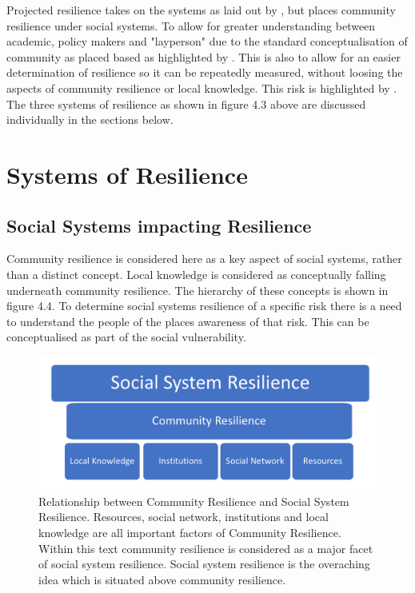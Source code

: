 Projected resilience takes on the systems as laid out by \cite{cutter_community_2020}, but places community resilience under social systems. To allow for greater understanding between academic, policy makers and "layperson" due to the standard conceptualisation of community as placed based as highlighted by \cite{rasanen_conceptualizing_2020}. This is also to allow for an easier determination of resilience so it can be repeatedly measured, without loosing the aspects of community resilience or local knowledge. This risk is highlighted by \cite{rasanen_conceptualizing_2020}. The three systems of resilience as shown in figure 4.3 above are discussed individually in the sections below.

\section{Systems of Resilience }

\subsection{Social Systems impacting Resilience}
Community resilience is considered here as a key aspect of social systems, rather than a distinct concept. Local knowledge is considered as conceptually falling underneath community resilience. The hierarchy of these concepts is shown in figure 4.4. To determine social systems resilience of a specific risk there is a need to understand the people of the places awareness of that risk. This can be conceptualised as part of the social vulnerability.


\begin{figure}[h]
    \centering
    \includegraphics[width=1\textwidth]{fig_theory/social system hierarchy.png}
    \caption{Relationship between Community Resilience and Social System Resilience. Resources, social network, institutions and local knowledge are all important factors of Community Resilience. Within this text community resilience is considered as a major facet of social system resilience. Social system resilience is the overaching idea which is situated above community resilience.}
    \label{fig:social_resilience}
\end{figure}
